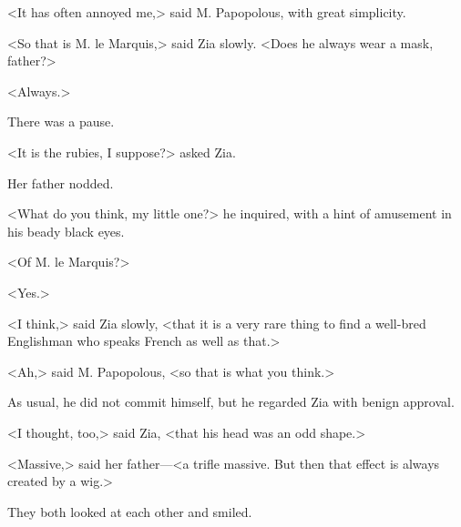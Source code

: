 <It has often annoyed me,> said M. Papopolous, with great simplicity.

<So that is M. le Marquis,> said Zia slowly. <Does he always wear a mask, father?>

<Always.>

There was a pause.

<It is the rubies, I suppose?> asked Zia.

Her father nodded.

<What do you think, my little one?> he inquired, with a hint of amusement in his beady black eyes.

<Of M. le Marquis?>

<Yes.>

<I think,> said Zia slowly, <that it is a very rare thing to find a well-bred Englishman who speaks French as well as that.>

<Ah,> said M. Papopolous, <so that is what you think.>

As usual, he did not commit himself, but he regarded Zia with benign approval.

<I thought, too,> said Zia, <that his head was an odd shape.>

<Massive,> said her father—<a trifle massive. But then that effect is always created by a wig.>

They both looked at each other and smiled.